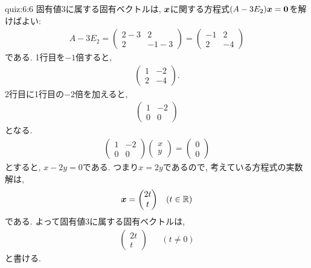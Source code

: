 \begin{answerof}{quiz:6:6}
  固有値$3$に属する固有ベクトルは,
  $\boldsymbol{x}$に関する方程式$(A-3E_2)\boldsymbol{x}=\boldsymbol{0}$を解けばよい:
  \begin{align*}
    A-3E_2=
    \begin{pmatrix}
      2-3&2\\2&-1-3
    \end{pmatrix}
    =
    \begin{pmatrix}
      -1&2\\2&-4
    \end{pmatrix}
  \end{align*}
  である.  1行目を$-1$倍すると,
  \begin{align*}
    \begin{pmatrix}
      1&-2\\2&-4
    \end{pmatrix}.
  \end{align*}
  2行目に1行目の$-2$倍を加えると,
  \begin{align*}
    \begin{pmatrix}
      1&-2\\0&0
    \end{pmatrix}
  \end{align*}
  となる.
  \begin{align*}
    \begin{pmatrix}
      1&-2\\0&0
    \end{pmatrix}
    \begin{pmatrix}
      x\\y
    \end{pmatrix}=
    \begin{pmatrix}
      0\\0
    \end{pmatrix}
  \end{align*}
  とすると, $x-2y=0$である.
  つまり$x=2y$であるので, 考えている方程式の実数解は,
  \begin{align*}
    \boldsymbol{x}=
    \begin{pmatrix}
      2t\\t
    \end{pmatrix}&&(t\in\mathbb{R})
  \end{align*}
  である.
  よって固有値$3$に属する固有ベクトルは,
  \begin{align*}
    \begin{pmatrix}
      2t\\t
    \end{pmatrix}&&(t\neq 0)
  \end{align*}
  と書ける.


\end{answerof}
